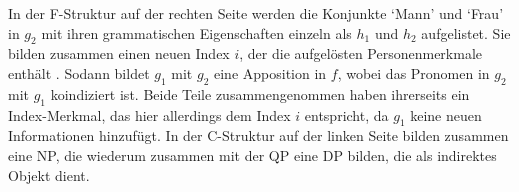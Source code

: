 In der F-Struktur auf der rechten Seite werden die Konjunkte  `Mann'
und  `Frau' in $g_2$ mit ihren grammatischen Eigenschaften einzeln
als $h_1$ und $h_2$ aufgelistet. Sie bilden zusammen einen neuen Index $i$, der
die aufgelösten Personenmerkmale enthält%
. Sodann bildet $g_1$ mit $g_2$ eine Apposition in $f$, wobei
das Pronomen  in $g_2$ mit $g_1$ koindiziert ist. Beide Teile
zusammengenommen haben ihrerseits ein Index-Merkmal, das hier allerdings dem
Index $i$ entspricht, da $g_1$ keine neuen Informationen hinzufügt. In der
C-Struktur auf der linken Seite bilden  zusammen eine NP,
die wiederum zusammen mit der QP  eine DP bilden, die als
indirektes Objekt dient.
